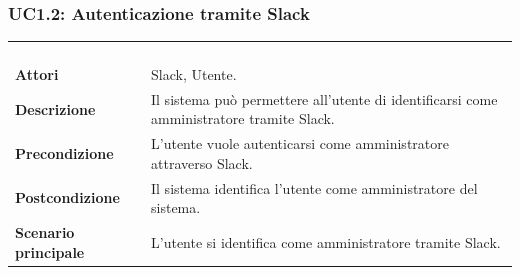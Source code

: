 \subsubsection{UC1.2: Autenticazione tramite Slack}
\label{UC1.2}
\begin{longtable}{l|p{10cm}}
	\rowcolor[gray]{0.8} \multicolumn{2}{c}{} \\
	\rowcolor[gray]{0.8} \multicolumn{2}{c}{\textbf{UC1.2 - Autenticazione tramite Slack}} \\
	\rowcolor[gray]{0.8} \multicolumn{2}{c}{} \\
	\hline
	&\\
	\textbf{Attori} & Slack, Utente.\\[7pt]
	\textbf{Descrizione} & Il sistema può permettere all'utente di identificarsi come amministratore tramite Slack.\\[7pt]
	\textbf{Precondizione} & L'utente vuole autenticarsi come amministratore attraverso Slack.\\[7pt]
	\textbf{Postcondizione} & Il sistema identifica l'utente come amministratore del sistema.\\[7pt]
	\textbf{Scenario principale} &L'utente si identifica come amministratore tramite Slack.\\[7pt]\hline
\end{longtable}

